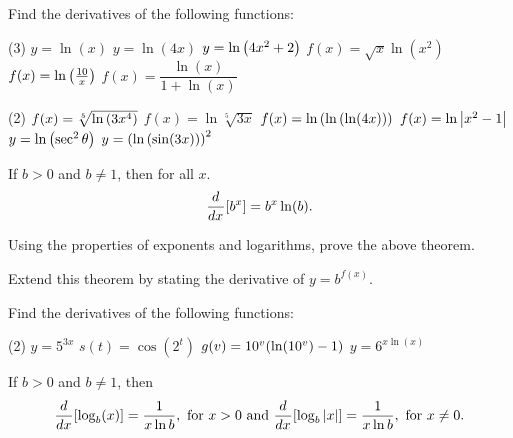 \documentclass[../mathNotesPreamble]{subfiles}
\begin{document}
  \begin{ex*}
    Find the derivatives of the following functions:
  \end{ex*}
  \begin{tasks}[after-item-skip=\stretch{1}, label=~](3)
    \task $y=\ln(x)$
    \task $y=\ln(4x)$
    \task $y=\ln{\left(4x^2+2\right)}$
    \task $f(x)=\sqrt x\ln(x^2)$
    \task $f(x)=\ln{\left(\frac{10}{x}\right)}$
    \task $f(x)=\dfrac{\ln(x)}{1+\ln(x)}$
  \end{tasks}
  \vfill
  
  \pagebreak
  \begin{tasks}[after-item-skip=\stretch{1}, label=~](2)
    \task $f(x)=\sqrt[5]{\ln{\left(3x^4\right)}}$
    \task $f(x)=\ln\sqrt[5]{3x}$
    \task $f(x)=\ln{\left(\ln{\left(\ln(4x)\right)}\right)}$
    \task $f(x)=\ln{\left\vert x^2-1\right\vert}$
    \task $y=\ln{\left(\sec^2\theta\right)}$
    \task $y={\left(\ln{\left(\sin(3x)\right)}\right)}^2$
  \end{tasks}
  \vfill 
  \pagebreak
  
  \begin{thmBox*}
    If $b>0$ and $b\neq 1$, then for all $x$.
      $${\frac{d^{}}{dx^{}}}{\left[b^x\right]}=b^x\ln(b).$$
  \end{thmBox*}

  \begin{ex*}
    Using the properties of exponents and logarithms, prove the above theorem. 
    
    \noindent
    Extend this theorem by stating the derivative of $y=b^{f(x)}$.
  \end{ex*}
  
  \begin{ex*}
    Find the derivatives of the following functions:
  \end{ex*}
  \begin{tasks}[after-item-skip=\stretch{1}, label=~](2)
    \task $y=5^{3x}$
    \task $s(t)=\cos(2^t)$
    \task $g(v)=10^v{\left(\ln(10^v)-1\right)}$
    \task $y=6^{x\ln(x)}$
  \end{tasks}
  \pagebreak
  
  \begin{thmBox*}
    If $b>0$ and $b\neq 1$, then
      \[{\frac{d^{}}{dx^{}}}{\left[\log_b(x)\right]}=\frac{1}{x\ln b},\text{ for }x>0 \text{ and }{\frac{d^{}}{dx^{}}}{\left[\log_b{\left\vert x\right\vert}\right]}=\frac{1}{x\ln b},\text{ for } x\neq 0.\]
  \end{thmBox*}
\end{document}
